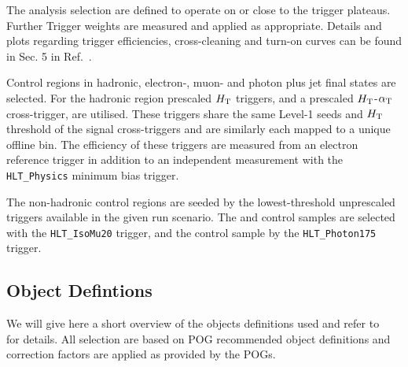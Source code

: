 The analysis selection are defined to operate on or close to the trigger plateaus. Further Trigger weights are measured and applied as appropriate. Details and plots regarding trigger efficiencies, cross-cleaning and turn-on curves can be found in Sec. 5 in Ref.~\cite{alphaTnote}.


Control regions in hadronic, electron-, muon- and photon plus jet final states are selected. For the hadronic region prescaled $\mbox{$H_\text{T}$}$ triggers, and a prescaled  $\mbox{$H_\text{T}$}$-$\alpha_{\text{T}}$ cross-trigger, are utilised. These triggers share the same Level-1 seeds and $\mbox{$H_\text{T}$}$ threshold of the signal cross-triggers and are similarly each mapped to a unique offline bin. The efficiency of these triggers are measured from an electron reference trigger in addition to an independent measurement with the \verb!HLT_Physics! 
minimum bias trigger.

The non-hadronic control regions are seeded by the lowest-threshold unprescaled triggers available in the given run scenario. The \mj and \mmj control samples are selected with the \verb!HLT_IsoMu20! trigger, and the \gj control sample by the \verb!HLT_Photon175! trigger. 


\subsection{Object Defintions}

We will give here a short overview of the objects definitions used and refer to ~\cite{alphaTnote} for details. All selection are based on POG recommended object definitions and correction factors are applied as provided by the POGs.

